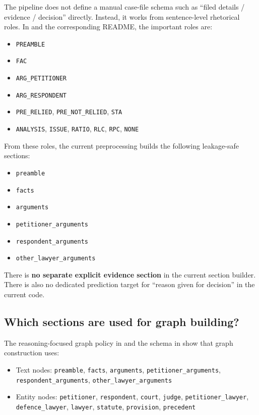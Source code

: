 \documentclass[12pt,a4paper]{article}
\begin{document}
The pipeline does not define a manual case-file schema such as ``filed details / evidence / decision'' directly. Instead, it works from sentence-level rhetorical roles. In  and the corresponding README, the important roles are:

\begin{itemize}[noitemsep]
\item \texttt{PREAMBLE}
\item \texttt{FAC}
\item \texttt{ARG\_PETITIONER}
\item \texttt{ARG\_RESPONDENT}
\item \texttt{PRE\_RELIED}, \texttt{PRE\_NOT\_RELIED}, \texttt{STA}
\item \texttt{ANALYSIS}, \texttt{ISSUE}, \texttt{RATIO}, \texttt{RLC}, \texttt{RPC}, \texttt{NONE}
\end{itemize}

From these roles, the current preprocessing builds the following leakage-safe sections:

\begin{itemize}[noitemsep]
\item \texttt{preamble}
\item \texttt{facts}
\item \texttt{arguments}
\item \texttt{petitioner\_arguments}
\item \texttt{respondent\_arguments}
\item \texttt{other\_lawyer\_arguments}
\end{itemize}

There is \textbf{no separate explicit evidence section} in the current section builder. There is also no dedicated prediction target for ``reason given for decision'' in the current code.

\subsection*{Which sections are used for graph building?}

The reasoning-focused graph policy in  and the schema in  show that graph construction uses:

\begin{itemize}[noitemsep]
\item Text nodes: \texttt{preamble}, \texttt{facts}, \texttt{arguments}, \texttt{petitioner\_arguments}, \texttt{respondent\_arguments}, \texttt{other\_lawyer\_arguments}
\item Entity nodes: \texttt{petitioner}, \texttt{respondent}, \texttt{court}, \texttt{judge}, \texttt{petitioner\_lawyer}, \texttt{defence\_lawyer}, \texttt{lawyer}, \texttt{statute}, \texttt{provision}, \texttt{precedent}
\end{itemize}
\end{document}
